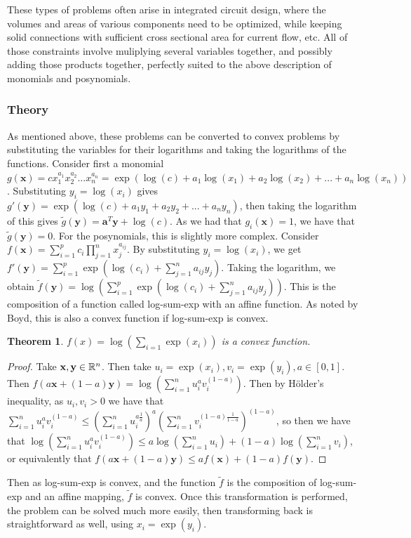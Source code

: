 \documentclass[10pt]{article}
\renewcommand{\vec}[1]{\mathbf{#1}}
\newcommand{\R}[1][]{ \ifx&#1& \mathbb{R} \else \mathbb{R}^{#1} \fi }
\newcommand{\affcomb}[3][a]{#1#2 + (1-#1)#3}
\newcommand{\x}{\vec{x}}
\renewcommand{\a}{\vec{a}}
\newtheorem{theorem}{Theorem}[section]
\begin{document}
These types of problems often arise in integrated circuit design\cite{boyd-gp-opamp}, where the volumes and areas of various components need to be optimized, while keeping solid connections with sufficient cross sectional area for current flow, etc. All of those constraints involve muliplying several variables together, and possibly adding those products together, perfectly suited to the above description of monomials and posynomials.
\subsubsection{Theory}
As mentioned above, these problems can be converted to convex problems by substituting the variables for their logarithms and taking the logarithms of the functions. Consider first a monomial $g(\x) = cx_1^{a_1}x_2^{a_2}...x_n^{a_n} = \exp(\log(c) + a_1\log(x_1) + a_2\log(x_2) + ... + a_n\log(x_n))$. Substituting $y_i = \log(x_i)$ gives $g'(\vec{y}) = \exp(\log(c) + a_1y_1 + a_2y_2 + ... + a_ny_n)$, then taking the logarithm of this gives $\tilde{g}(\vec{y}) = \a^T\vec{y} + \log(c)$. As we had that $g_i(\x) = 1$, we have that $\tilde{g}(\vec{y}) = 0$. For the posynomials, this is slightly more complex. Consider $f(\x) = \sum_{i=1}^{p}c_i\prod_{j=1}^{n}x_j^{a_{ij}}$. By substituting $y_i = \log(x_i)$, we get $f'(\vec{y})=\sum_{i=1}^{p}\exp\left(\log(c_i) + \sum_{j=1}^{n}a_{ij}y_j\right)$. Taking the logarithm, we obtain $\tilde{f}(\vec{y}) = \log\left(\sum_{i=1}^{p}\exp\left(\log(c_i) + \sum_{j=1}^{n}a_{ij}y_j\right)\right)$. This is the composition of a function called log-sum-exp with an affine function. As noted by Boyd, \cite{boyd} this is also a convex function if log-sum-exp is convex.
\begin{theorem}
	$f(x) = \log\left(\sum_{i=1}\exp(x_i)\right)$ is a convex function.
\end{theorem}
\begin{proof}
	Take $\x, \vec{y}\in \R[n]$. Then take $u_i = \exp(x_i), v_i = \exp(y_i), a\in[0,1]$. Then $f(\affcomb{\x}{\vec{y}}) = \log\left(\sum_{i=1}^{n}u_i^av_i^{(1-a)}\right)$. Then by H\"{o}lder's inequality, as $u_i, v_i>0$ we have that $\sum_{i=1}^{n}u_i^av_i^{(1-a)} \leq (\sum_{i=1}^{n}u_i^{a\frac{1}{a}})^a(\sum_{i=1}^{n}v_i^{(1-a)\frac{1}{1-a}})^{(1-a)}$, so then we have that $\log\left(\sum_{i=1}^{n}u_i^av_i^{(1-a)}\right)\leq a\log\left(\sum_{i=1}^{n}u_i\right) + (1-a)\log\left(\sum_{i=1}^{n}v_i\right)$, or equivalently that $f(\affcomb{\x}{\vec{y}})\leq\affcomb{f(\x)}{f(\vec{y})}$.
\end{proof}
Then as log-sum-exp is convex, and the function $\tilde{f}$ is the composition of log-sum-exp and an affine mapping, $\tilde{f}$ is convex. Once this transformation is performed, the problem can be solved much more easily, then transforming back is straightforward as well, using $x_i = \exp(y_i)$.
\end{document}
